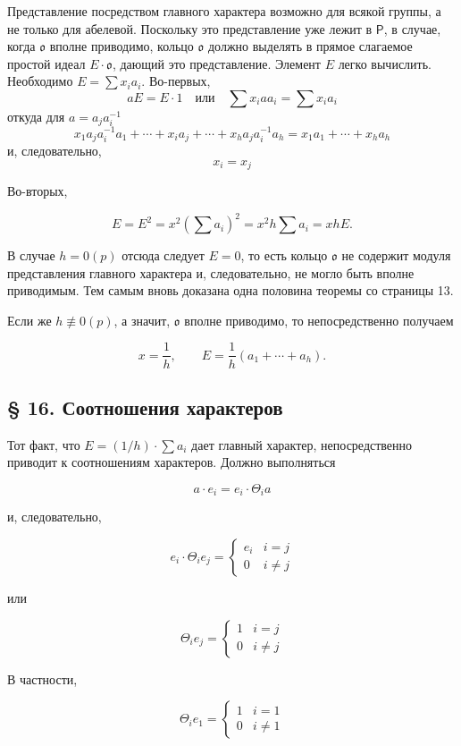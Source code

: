 \documentclass[11pt]{article}
\begin{document}
Представление посредством главного характера возможно для всякой группы, а не только для абелевой. Поскольку это представление уже лежит в \(\mathsf P\), в случае, когда \(\mathfrak o\) вполне приводимо, кольцо \(\mathfrak o\) должно выделять в прямое слагаемое простой идеал \(E\cdot\mathfrak o\), дающий это представление. Элемент \(E\) легко вычислить. Необходимо \(E=\sum x_i a_i\). Во-первых,
\[
aE=E\cdot 1\quad\text{или}\quad \sum x_i a a_i=\sum x_i a_i
\]
откуда для \(a=a_j a_i^{-1}\)
\[
x_1a_ja_i^{-1}a_1+\cdots+x_i a_j+\cdots+x_ha_ja_i^{-1}a_h
=x_1a_1+\cdots+x_ha_h
\]
и, следовательно,
\[
x_i=x_j
\]

Во-вторых,

\[
E=E^2=x^2\left(\sum a_i\right)^2=x^2h\sum a_i=xhE.
\]

В случае \(h=0(p)\) отсюда следует \(E=0\), то есть кольцо \(\mathfrak o\) не содержит модуля представления главного характера и, следовательно, не могло быть вполне приводимым. Тем самым вновь доказана одна половина теоремы со страницы 13.

Если же \(h\not\equiv0(p)\), а значит, \(\mathfrak o\) вполне приводимо, то непосредственно получаем

\[
x=\frac{1}{h},\qquad E=\frac{1}{h}(a_1+\cdots+a_h).
\]

\subsection*{§ 16. Соотношения характеров}\label{die-charakterenrelationen}

Тот факт, что \(E=(1/h)\cdot\sum a_i\) дает главный характер, непосредственно приводит к соотношениям характеров. Должно выполняться

\[a \cdot e_i = e_i \cdot \Theta_i a\]

и, следовательно,

\[e_i \cdot \Theta_i e_j = \begin{cases} e_i & i = j \\ 0 & i \neq j \end{cases}\]

или

\[\Theta_i e_j = \begin{cases} 1 & i = j \\ 0 & i \neq j \end{cases}\]

В частности,

\[\Theta_i e_1 = \begin{cases} 1 & i = 1 \\ 0 & i \neq 1 \end{cases}\]
\end{document}
